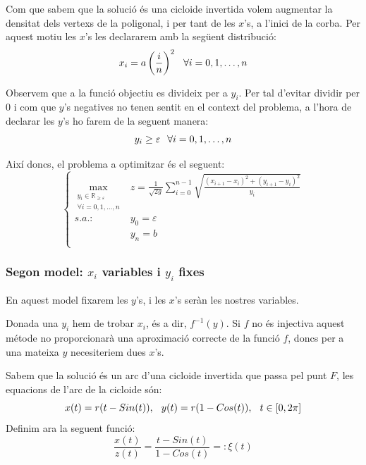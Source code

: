 \documentclass[10pt]{extarticle}
\begin{document}
Com que sabem que la solució és una cicloide invertida volem augmentar la densitat dels vertexs de la poligonal, i per tant de les $x$'s, a l'inici de la corba. Per aquest motiu les $x$'s les declararem amb la següent distribució:
$$x_i = a\left(\frac{i}{n}\right)^2 \hspace{.25cm} \forall i = 0,1,\hdots,n$$

Observem que a la funció objectiu es divideix per a $y_i$. Per tal d'evitar dividir per $0$ i com que $y$'s negatives no tenen sentit en el context del problema, a l'hora de declarar les $y$'s ho farem de la seguent manera:
$$y_i \ge \varepsilon \hspace{.25cm} \forall i = 0,1,\hdots,n$$

Així doncs, el problema a optimitzar és el seguent:
\begin{equation*}
    \left\{
    \begin{array}{ll}
        \displaystyle{\max\limits_{\substack{y_i \in \mathbb{R}_{\ge\varepsilon} \\ \forall i = 0,1,\hdots,n}}} & \displaystyle{z = \frac{1}{\sqrt{2g}} \sum_{i = 0}^{n-1} \sqrt{\frac{(x_{i+1}-x_i)^2+(y_{i+1}-y_i)^2}{y_i}}} \\
        s.a.: & \displaystyle{y_0} = \varepsilon \\
        & \displaystyle{y_n} = b \\
    \end{array}
    \right.
\end{equation*}

\subsubsection{Segon model: $x_i$ variables i $y_i$ fixes}
En aquest model fixarem les $y$'s, i les $x$'s seràn les nostres variables. \vspace{.25cm}

Donada una $y_i$ hem de trobar $x_i$, és a dir, $f^{-1}(y)$. Si $f$ no és injectiva aquest métode no proporcionarà una aproximació correcte de la funció $f$, doncs per a una mateixa $y$ necesiteriem dues $x$'s. \vspace{.25cm}

Sabem que la solució és un arc d'una cicloide invertida que passa pel punt $F$, les equacions de l'arc de la cicloide són:
$$x(t) = r(t-Sin(t)), \hspace{.25cm} y(t) = r(1-Cos(t)), \hspace{.25cm} t\in[0,2\pi]$$
\vspace{.5cm}
Definim ara la seguent funció:
$$\frac{x(t)}{z(t)} = \frac{t - Sin(t)}{1 - Cos(t)} =: \xi(t)$$
\end{document}
